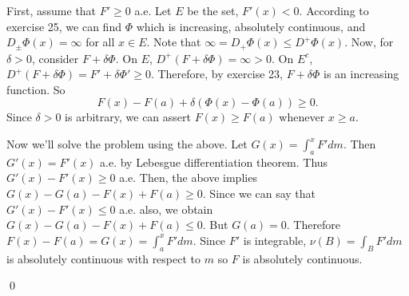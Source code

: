 \begin{problem}[3.5] \hfill
	
	First, assume that $F' \ge 0$ a.e.
	Let $E$ be the set, $F'(x) < 0$.
	According to exercise 25, we can find $\Phi$ which is increasing, absolutely continuous, and $D_{\pm}\Phi(x) = \infty$ for all $x \in E$.
	Note that $\infty = D_{+}\Phi(x) \le D^+\Phi(x)$.
	Now, for $\delta >0$, consider $F+\delta \Phi$.
	On $E$, $D^+(F+\delta \Phi) = \infty >0$.
	On $E^c$, $D^+(F+\delta \Phi) = F' + \delta \Phi' \ge 0$.
	Therefore, by exercise 23, $F+\delta \Phi$ is an increasing function.
	So
	\[
		F(x)-F(a) + \delta(\Phi(x) - \Phi(a)) \ge 0.
	\]
	Since $\delta>0$ is arbitrary, we can assert $F(x) \ge F(a)$ whenever $x \ge a$.

	Now we'll solve the problem using the above.
	Let $G(x) = \int_a^x F' dm$.
	Then $G'(x) = F'(x)$ a.e. by Lebesgue differentiation theorem.
	Thus $G'(x) - F'(x) \ge 0$ a.e.
	Then, the above implies $G(x) - G(a) - F(x) + F(a) \ge 0$.
	Since we can say that $G'(x) - F'(x) \le 0$ a.e. also,
	we obtain $G(x) - G(a) -F(x) + F(a) \le 0$.
	But $G(a) = 0$.
	Therefore $F(x) - F(a) = G(x) = \int_a^x F' dm$.
	Since $F'$ is integrable, $\nu(B) = \int_B F' dm$ is absolutely continuous with respect to $m$
	so $F$ is absolutely continuous.

	\qed
\end{problem}

